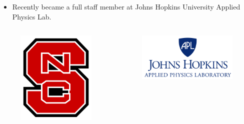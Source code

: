 \documentclass[9pt]{beamer}
\begin{document}
\begin{frame}
\begin{itemize}
		\item Recently became a full staff member at Johns Hopkins University Applied Physics Lab. 
	\end{itemize}
	\begin{columns}
		\begin{column}{2.5cm}
			\begin{figure}
				\includegraphics[scale=0.04]{NCSU.png}
			\end{figure}
		\end{column}
		\begin{column}{4cm}
			\begin{figure}
				\includegraphics[scale=0.14]{jhuapl-logo.png}
			\end{figure}
		\end{column}
	\end{columns} 
\end{frame}
\end{document}

